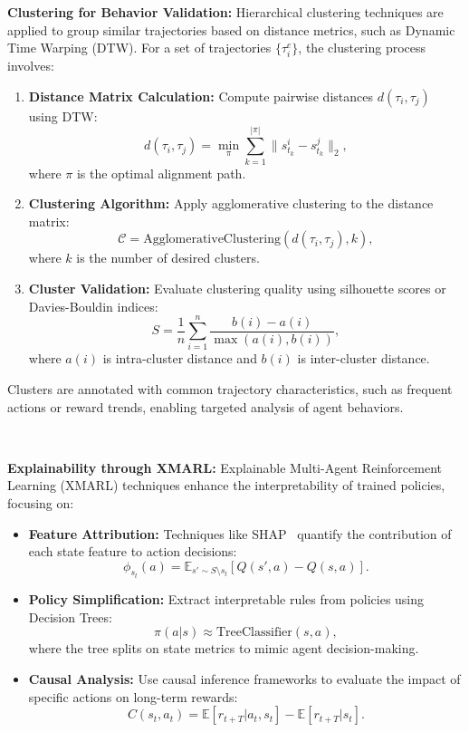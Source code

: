 \documentclass[conference]{IEEEtran}
\begin{document}
\noindent\textbf{Clustering for Behavior Validation:}
Hierarchical clustering techniques are applied to group similar trajectories based on distance metrics, such as Dynamic Time Warping (DTW). For a set of trajectories $\{\tau_i^e\}$, the clustering process involves:
\begin{enumerate}
    \item \textbf{Distance Matrix Calculation:} Compute pairwise distances $d(\tau_i, \tau_j)$ using DTW:
    \[
    d(\tau_i, \tau_j) = \min_{\pi} \sum_{k=1}^{|\pi|} \|s_{t_k}^i - s_{t_k}^j\|_2,
    \]
    where $\pi$ is the optimal alignment path.
    \item \textbf{Clustering Algorithm:} Apply agglomerative clustering to the distance matrix:
    \[
    \mathcal{C} = \text{AgglomerativeClustering}(d(\tau_i, \tau_j), k),
    \]
    where $k$ is the number of desired clusters.
    \item \textbf{Cluster Validation:} Evaluate clustering quality using silhouette scores or Davies-Bouldin indices:
    \[
    S = \frac{1}{n} \sum_{i=1}^n \frac{b(i) - a(i)}{\max(a(i), b(i))},
    \]
    where $a(i)$ is intra-cluster distance and $b(i)$ is inter-cluster distance.
\end{enumerate}

Clusters are annotated with common trajectory characteristics, such as frequent actions or reward trends, enabling targeted analysis of agent behaviors.

\

\noindent\textbf{Explainability through XMARL:}
Explainable Multi-Agent Reinforcement Learning (XMARL) techniques enhance the interpretability of trained policies, focusing on:
\begin{itemize}
    \item \textbf{Feature Attribution:} Techniques like SHAP~\cite{SHAP2020} quantify the contribution of each state feature to action decisions:
    \[
    \phi_{s_t}(a) = \mathbb{E}_{s' \sim S \setminus s_t} \left[ Q(s', a) - Q(s, a) \right].
    \]
    \item \textbf{Policy Simplification:} Extract interpretable rules from policies using Decision Trees:
    \[
    \pi(a|s) \approx \text{TreeClassifier}(s, a),
    \]
    where the tree splits on state metrics to mimic agent decision-making.
    \item \textbf{Causal Analysis:} Use causal inference frameworks to evaluate the impact of specific actions on long-term rewards:
    \[
    C(s_t, a_t) = \mathbb{E}[r_{t+T}|a_t, s_t] - \mathbb{E}[r_{t+T}|s_t].
    \]
\end{itemize}
\end{document}
